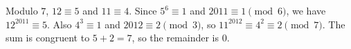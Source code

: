Modulo $7$, $12\equiv5$ and $11\equiv4$. Since $5^6\equiv1$ and $2011\equiv1\pmod6$, we have $12^{2011}\equiv5$. Also $4^3\equiv1$ and $2012\equiv2\pmod3$, so $11^{2012}\equiv4^2\equiv2\pmod7$. The sum is congruent to $5+2=7$, so the remainder is $\boxed0$.
